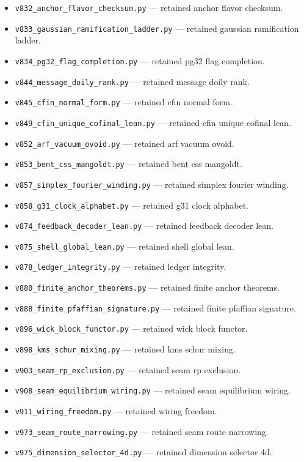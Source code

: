 \begin{itemize}[leftmargin=2em,itemsep=1pt]
\item \texttt{v832\_anchor\_flavor\_checksum.py} --- retained anchor flavor checksum.
\item \texttt{v833\_gaussian\_ramification\_ladder.py} --- retained gaussian ramification ladder.
\item \texttt{v834\_pg32\_flag\_completion.py} --- retained pg32 flag completion.
\item \texttt{v844\_message\_doily\_rank.py} --- retained message doily rank.
\item \texttt{v845\_cfin\_normal\_form.py} --- retained cfin normal form.
\item \texttt{v849\_cfin\_unique\_cofinal\_lean.py} --- retained cfin unique cofinal lean.
\item \texttt{v852\_arf\_vacuum\_ovoid.py} --- retained arf vacuum ovoid.
\item \texttt{v853\_bent\_css\_mangoldt.py} --- retained bent css mangoldt.
\item \texttt{v857\_simplex\_fourier\_winding.py} --- retained simplex fourier winding.
\item \texttt{v858\_g31\_clock\_alphabet.py} --- retained g31 clock alphabet.
\item \texttt{v874\_feedback\_decoder\_lean.py} --- retained feedback decoder lean.
\item \texttt{v875\_shell\_global\_lean.py} --- retained shell global lean.
\item \texttt{v878\_ledger\_integrity.py} --- retained ledger integrity.
\item \texttt{v880\_finite\_anchor\_theorems.py} --- retained finite anchor theorems.
\item \texttt{v888\_finite\_pfaffian\_signature.py} --- retained finite pfaffian signature.
\item \texttt{v896\_wick\_block\_functor.py} --- retained wick block functor.
\item \texttt{v898\_kms\_schur\_mixing.py} --- retained kms schur mixing.
\item \texttt{v903\_seam\_rp\_exclusion.py} --- retained seam rp exclusion.
\item \texttt{v908\_seam\_equilibrium\_wiring.py} --- retained seam equilibrium wiring.
\item \texttt{v911\_wiring\_freedom.py} --- retained wiring freedom.
\item \texttt{v973\_seam\_route\_narrowing.py} --- retained seam route narrowing.
\item \texttt{v975\_dimension\_selector\_4d.py} --- retained dimension selector 4d.

\end{itemize}
